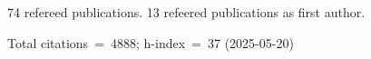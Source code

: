 74 refereed publications. 13 refeered publications as first author.

Total citations~=~4888; h-index~=~37 (2025-05-20)